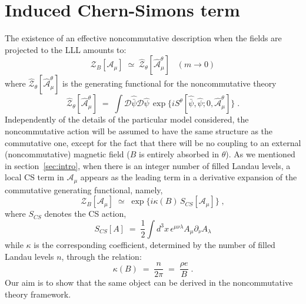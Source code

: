 \documentclass[a4paper,12pt]{article}
\begin{document}
\section{Induced Chern-Simons term}\label{sec:ics}
The existence of an effective noncommutative description when the
fields are projected to the LLL amounts to:
\begin{equation}
  \label{eq:zs}
  {\mathcal Z}_B[{\mathcal A}_\mu] \;\simeq\; 
\widehat{\mathcal Z}_\theta[{\widehat {\mathcal A}}^\theta_\mu] \;\;\;(m \to 0)  
\end{equation}
where $\widehat{\mathcal Z}_\theta[{\widehat {\mathcal A}}^\theta_\mu]$ is the
generating functional for the noncommutative theory 
\begin{equation}
  \label{eq:zncomm}
  \widehat{\mathcal Z}_\theta[{\widehat {\mathcal A}}^\theta_\mu]\;=\; 
\int {\mathcal D}{\widehat {\bar \psi}}
{\mathcal D}{\widehat \psi} \, \exp \{i S^\theta[{\widehat{\bar \psi}},
{\widehat \psi};0,{\widehat {\mathcal A}}^\theta_\mu] \}     \;.
\end{equation}
Independently of the details of the particular model considered, the
noncommutative action will be assumed to have the same structure as
the commutative one, except for the fact that there will be no
coupling to an external (noncommutative) magnetic field ($B$ is
entirely absorbed in $\theta$).  As we mentioned in
section~\ref{sec:intro}, when there is an integer number of filled
Landau levels, a local CS term in ${\mathcal A}_\mu$ appears as the
leading term in a derivative expansion of the commutative generating
functional, namely,
\begin{equation}
  \label{eq:zcexp}
  {\mathcal Z}_B[{\mathcal A}_\mu]\;\simeq\;\exp \{i \kappa(B) \, S_{CS}[{\mathcal A}_\mu] \} \;,
\end{equation} 
where $S_{CS}$ denotes the CS action,
\begin{equation}
  \label{eq:defscs}
S_{CS}[A]\;=\;\frac{1}{2}\int d^3x\,\epsilon^{\mu\nu\lambda} A_\mu\partial_\nu A_\lambda  
\end{equation}
while $\kappa$ is the corresponding coefficient, determined by the number
of filled Landau levels $n$, through the relation:
\begin{equation}
  \label{eq:defk}
\kappa(B) \;=\;{\frac {n}{2\pi}}\;=\;{\frac { \rho e}{B}} \;.
\end{equation}
Our aim is to show that the same object can be derived in the
noncommutative theory framework.
\end{document}
